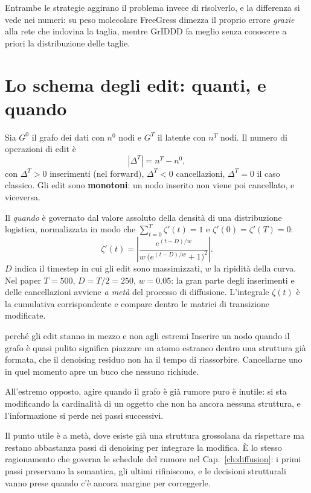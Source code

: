 Entrambe le strategie aggirano il problema invece di risolverlo, e la differenza si vede nei numeri: su peso molecolare FreeGress dimezza il proprio errore \emph{grazie} alla rete che indovina la taglia, mentre GrIDDD fa meglio senza conoscere a priori la distribuzione delle taglie.

\section{Lo schema degli edit: quanti, e quando}

Sia $G^0$ il grafo dei dati con $n^0$ nodi e $G^T$ il latente con $n^T$ nodi. Il numero di operazioni di edit è
\[
|\Delta^T| = n^T - n^0,
\]
con $\Delta^T > 0$ inserimenti (nel forward), $\Delta^T < 0$ cancellazioni, $\Delta^T = 0$ il caso classico. Gli edit sono \textbf{monotoni}: un nodo inserito non viene poi cancellato, e viceversa.

Il \emph{quando} è governato dal valore assoluto della densità di una distribuzione logistica, normalizzata in modo che $\sum_{t=0}^{T}\zeta'(t) = 1$ e $\zeta'(0) = \zeta'(T) = 0$:
\[
\zeta'(t) = \left|\frac{e^{(t-D)/w}}{w\,\big(e^{(t-D)/w}+1\big)^2}\right|.
\]
$D$ indica il timestep in cui gli edit sono massimizzati, $w$ la ripidità della curva. Nel paper $T = 500$, $D = T/2 = 250$, $w = 0.05$: la gran parte degli inserimenti e delle cancellazioni avviene \emph{a metà} del processo di diffusione. L'integrale $\zeta(t)$ è la cumulativa corrispondente e compare dentro le matrici di transizione modificate.

\begin{intuizione}{perché gli edit stanno in mezzo e non agli estremi}
Inserire un nodo quando il grafo è quasi pulito significa piazzare un atomo estraneo dentro una struttura già formata, che il denoising residuo non ha il tempo di riassorbire. Cancellarne uno in quel momento apre un buco che nessuno richiude.

All'estremo opposto, agire quando il grafo è già rumore puro è inutile: si sta modificando la cardinalità di un oggetto che non ha ancora nessuna struttura, e l'informazione si perde nei passi successivi.

Il punto utile è a metà, dove esiste già una struttura grossolana da rispettare ma restano abbastanza passi di denoising per integrare la modifica. È lo stesso ragionamento che governa le schedule del rumore nel Cap.~\ref{ch:diffusion}: i primi passi preservano la semantica, gli ultimi rifiniscono, e le decisioni strutturali vanno prese quando c'è ancora margine per correggerle.
\end{intuizione}

